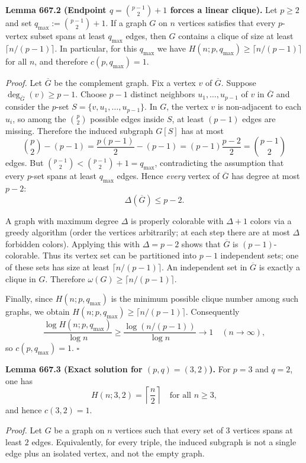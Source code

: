 \medskip
\noindent\textbf{Lemma 667.2 (Endpoint $q=\binom{p-1}{2}+1$ forces a linear clique).}
Let $p\ge 2$ and set $q_\max := \binom{p-1}{2}+1$.
If a graph $G$ on $n$ vertices satisfies that every $p$-vertex subset spans at least $q_\max$ edges, then $G$ contains a clique of size at least $\lceil n/(p-1)\rceil$.
In particular, for this $q_\max$ we have $H(n;p,q_\max)\ge \lceil n/(p-1)\rceil$ for all $n$, and therefore $c(p,q_\max)=1$.

\noindent\emph{Proof.}
Let $\overline{G}$ be the complement graph.
Fix a vertex $v$ of $\overline{G}$. Suppose $\deg_{\overline{G}}(v)\ge p-1$.
Choose $p-1$ distinct neighbors $u_1,\dots,u_{p-1}$ of $v$ in $\overline{G}$ and consider the $p$-set
$S=\{v,u_1,\dots,u_{p-1}\}$.
In $G$, the vertex $v$ is non-adjacent to each $u_i$, so among the ${p\choose 2}$ possible edges inside $S$, at least $(p-1)$ edges are missing.
Therefore the induced subgraph $G[S]$ has at most
\[
\binom{p}{2}-(p-1) 
= \frac{p(p-1)}{2}-(p-1)
= (p-1)\frac{p-2}{2}
= \binom{p-1}{2}
\]
edges.
But $\binom{p-1}{2} < \binom{p-1}{2}+1=q_\max$, contradicting the assumption that every $p$-set spans at least $q_\max$ edges.
Hence \emph{every} vertex of $\overline{G}$ has degree at most $p-2$:
\[
\Delta(\overline{G})\le p-2.
\]

A graph with maximum degree $\Delta$ is properly colorable with $\Delta+1$ colors via a greedy algorithm (order the vertices arbitrarily; at each step there are at most $\Delta$ forbidden colors).
Applying this with $\Delta=p-2$ shows that $\overline{G}$ is $(p-1)$-colorable.
Thus its vertex set can be partitioned into $p-1$ independent sets; one of these sets has size at least $\lceil n/(p-1)\rceil$.
An independent set in $\overline{G}$ is exactly a clique in $G$.
Therefore $\omega(G)\ge \lceil n/(p-1)\rceil$.

Finally, since $H(n;p,q_\max)$ is the minimum possible clique number among such graphs, we obtain $H(n;p,q_\max)\ge \lceil n/(p-1)\rceil$.
Consequently
\[
\frac{\log H(n;p,q_\max)}{\log n} \ge \frac{\log( n/(p-1))}{\log n} \to 1
\quad (n\to\infty),
\]
so $c(p,q_\max)=1$.
\hfill$\square$

\medskip
\noindent\textbf{Lemma 667.3 (Exact solution for $(p,q)=(3,2)$).}
For $p=3$ and $q=2$, one has
\[
H(n;3,2)=\left\lceil \frac{n}{2}\right\rceil \quad\text{for all } n\ge 3,
\]
and hence $c(3,2)=1$.

\noindent\emph{Proof.}
Let $G$ be a graph on $n$ vertices such that every set of $3$ vertices spans at least $2$ edges.
Equivalently, for every triple, the induced subgraph is not a single edge plus an isolated vertex, and not the empty graph.

